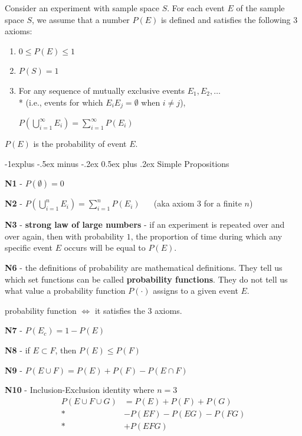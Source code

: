\documentclass[10pt, landscape]{article}
\makeatletter
\renewcommand{\subsection}{\@startsection{subsection}{2}{0mm}%
  {-1explus -.5ex minus -.2ex}%
  {0.5ex plus .2ex}%
{\normalfont\normalsize\bfseries}}
\makeatother
\begin{document}
\begin{multicols*}{3}
  Consider an experiment with sample space $S$. 
  For each event $E$ of the sample space $S$, we assume that a number $P(E)$ is defined and satisfies the following 3 axioms:
  \begin{enumerate}
    \item $0 \leq P(E) \leq 1$ 
    \item $P(S) = 1$
    \item For any sequence of mutually exclusive events $E_1, E_2, \dots$ 
      \\* (i.e., events for which $E_iE_j = \emptyset$ when  $i \neq j$),
      \begin{tightcenter}
        $P(\bigcup\limits^\infty_{i=1} E_i) = \sum\limits^\infty_{i=1} P(E_i)$ 
      \end{tightcenter}
  \end{enumerate}
  $P(E)$ is the probability of event $E$.

  \subsection{Simple Propositions}

  \textbf{N1} - $P(\emptyset) = 0$

  \textbf{N2} - $P(\bigcup\limits^n_{i=1} E_i) = \sum\limits^n_{i=1} P(E_i)$ 
  $\quad$ (aka axiom 3 for a finite $n$)

  \textbf{N3} - \textbf{strong law of large numbers} - if an experiment is repeated over and over again, then with probability $1$, 
  the proportion of time during which any specific event $E$ occurs will be equal to $P(E)$.

  \textbf{N6} - the definitions of probability are mathematical definitions. 
  They tell us which set functions can be called \textbf{probability functions}. 
  They do not tell us what value a probability function $P(\cdot)$ assigns to a given event $E$.

  \begin{tightcenter}
    probability function $\iff$ it satisfies the 3 axioms.
  \end{tightcenter}

  \textbf{N7} - $P(E_c) = 1-P(E)$

  \textbf{N8} - if $E \subset F$, then $P(E) \leq P(F)$

  \textbf{N9} - $P(E \cup F) = P(E) + P(F) - P(E \cap F)$

  \textbf{N10} - Inclusion-Exclusion identity where $n=3$
  \begin{align*}
    P(E \cup F \cup G) &= P(E) + P(F) + P(G) \\*
                       &- P(EF) - P(EG) - P(FG) \\*
                       &+ P(EFG)
  \end{align*}


\end{multicols*}
\end{document}
